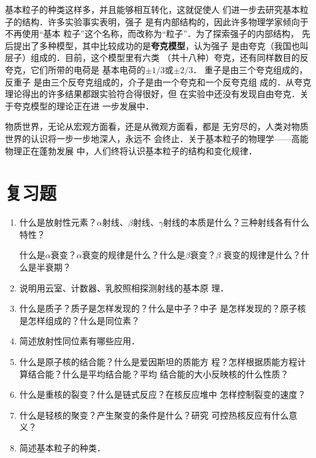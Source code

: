 基本粒子的种类这样多，并且能够相互转化，这就促使人
们进一步去研究基本粒子的结构．许多实验事实表明，强子
是有内部结构的，因此许多物理学家倾向于不再使用“基本
粒子”这个名称，而改称为“粒子”．为了探索强子的内部结构，
先后提出了多种模型，其中比较成功的是\textbf{夸克模型}，认为强子
是由夸克（我国也叫层子）组成的．目前，这个模型里有六类
（共十八种）夸克，还有同样数目的反夸克，它们所带的电荷是
基本电荷的$\pm1/3$或$\pm 2/3$．
重子是由三个夸克组成的，反重子
是由三个反夸克组成的，介子是由一个夸克和一个反夸克组
成的．从夸克理论得出的许多结果都跟实验符合得很好，但
在实验中还没有发现自由夸克．关于夸克模型的理论正在进
一步发展中．

物质世界，无论从宏观方面看，还是从微观方面看，都是
无穷尽的，人类对物质世界的认识将一步一步地深人，永远不
会终止．关于基本粒子的物理学——高能物理正在蓬勃发展
中，人们终将认识基本粒子的结构和变化规律．


\section*{复习题}
\begin{enumerate}
    \item 什么是放射性元素？$\alpha$射线、$\beta$射线、$\gamma$射线的本质是什么？三种射线各有什么特性？

    什么是$\alpha$衰变？$\alpha$衰变的规律是什么？什么是$\beta$衰变？$\beta$
    衰变的规律是什么？什么是半衰期？
    \item 说明用云室、计数器、乳胶照相探测射线的基本原
    理．
    \item 什么是质子？质子是怎样发现的？什么是中子？中子
    是怎样发现的？原子核是怎样组成的？什么是同位素？
    \item 简述放射性同位素有哪些应用．
    \item 什么是原子核的结合能？什么是爱因斯坦的质能方
    程？怎样根据质能方程计算结合能？什么是平均结合能？平均
    结合能的大小反映核的什么性质？
    \item 什么是重核的裂变？什么是链式反应？在核反应堆中
    怎样控制裂变的速度？
    \item 什么是轻核的聚变？产生聚变的条件是什么？研究
    可控热核反应有什么意义？
    \item 简述基本粒子的种类．
\end{enumerate}



